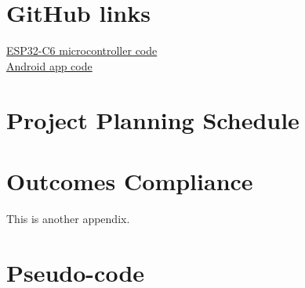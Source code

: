\chapter{GitHub links}
\makeatletter{}\makeatother
\label{appen:github}

\href{https://github.com/22546723/skripsie_esp32_code}{ESP32-C6 microcontroller code} \\
\href{https://github.com/22546723/skripsie_android_app}{Android app code}

\chapter{Project Planning Schedule}
\makeatletter{}\makeatother
\label{appen:schedule}



\chapter{Outcomes Compliance}
\makeatletter{}\makeatother
\label{appen:outcomes}

This is another appendix.


\chapter{Pseudo-code}
\makeatletter{}\makeatother
\label{appen:pseudocode}



